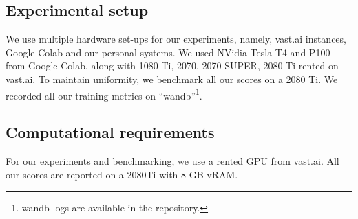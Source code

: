 \subsection{Experimental setup}
We use multiple hardware set-ups for our experiments, namely, vast.ai instances, Google Colab and our personal systems. We used NVidia Tesla T4 and P100 from Google Colab, along with 1080 Ti, 2070, 2070 SUPER, 2080 Ti rented on vast.ai. To maintain uniformity, we benchmark all our scores on a 2080 Ti. We recorded all our training metrics on “wandb”\footnote{wandb logs are available in the repository.}. 




\subsection{Computational requirements}
For our experiments and benchmarking, we use a rented GPU from vast.ai. All our scores are reported on a 2080Ti with 8 GB vRAM.

